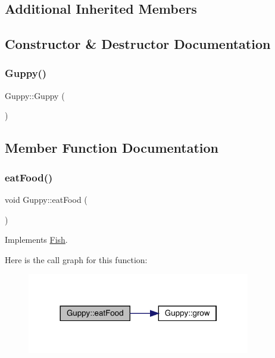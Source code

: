 \subsection*{Additional Inherited Members}


\subsection{Constructor \& Destructor Documentation}
\mbox{\label{class_guppy_aa78f8b5323b1015c968a8edab52773f5}} 
\subsubsection{\texorpdfstring{Guppy()}{Guppy()}}
{\footnotesize\ttfamily Guppy\+::\+Guppy (\begin{DoxyParamCaption}{ }\end{DoxyParamCaption})}



\subsection{Member Function Documentation}
\mbox{\label{class_guppy_a50115297f5c2f4df46e3613e09db115e}} 
\subsubsection{\texorpdfstring{eat\+Food()}{eatFood()}}
{\footnotesize\ttfamily void Guppy\+::eat\+Food (\begin{DoxyParamCaption}{ }\end{DoxyParamCaption})\hspace{0.3cm}{\ttfamily [virtual]}}



Implements \mbox{\hyperlink{class_fish_aad629fb35c786b2a44c1204d011f9ae4}{Fish}}.

Here is the call graph for this function\+:
\nopagebreak
\begin{figure}[H]
\begin{center}
\leavevmode
\includegraphics[width=276pt]{class_guppy_a50115297f5c2f4df46e3613e09db115e_cgraph}
\end{center}
\end{figure}
\mbox{\label{class_guppy_ab3fef72b059ac88a3e901af4db113e1d}} 
